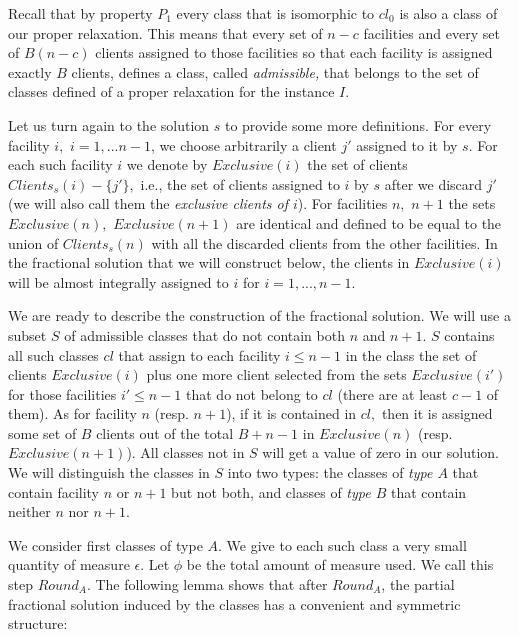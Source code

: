 \documentclass[11pt]{article}\usepackage{amsmath}
\begin{document}
Recall that by property $P_1$ every class that is isomorphic to $cl_0$ is
also a class of our proper relaxation. This means that
every set  of $n-c$ facilities and every  set of $B(n-c)$ clients
assigned to those facilities so that each facility is assigned exactly
$B$ clients, defines a class, called {\em admissible,} that belongs to the set of classes
defined of a  proper relaxation for the instance $I$.

Let  us  turn  again  to  the solution  $s$  to  provide  some  more
definitions.  For   every  facility  $i,$   $i=1,...n-1$,  we  choose
arbitrarily a client $j'$ assigned to  it by $s$. For each such facility
$i$  we   denote  by  $Exclusive(i)$   the  set  of   clients  $
Clients_s(i) - \{j' \},$ i.e., the set of clients assigned to
$i$ by $s$ after we discard $j'$ (we will also call them the
{\em exclusive clients of $i$}). For facilities $n,$ $n+1$ the sets
$Exclusive(n),$ $Exclusive(n+1)$ are identical  and defined to be equal to 
 the union of $Clients_s(n)$ with all
the  discarded clients from  the other  facilities. In  the fractional
solution that we will construct below, the clients in $Exclusive(i)$
will be almost integrally assigned to $i$ for $i=1,...,n-1$.

We  are   ready  to  describe  the  construction   of  the  fractional
solution. We will use a subset $S$ of admissible classes that 
do not contain both $n$ and  $n+1$. $S$ contains all such classes   
 $cl$ that assign to each facility $i \leq
n-1$  in the class  the set  of clients  $Exclusive(i)$ plus  one more
client selected  from the sets $Exclusive(i')$  for those facilities
$i' \leq n-1$ that do not belong  to $cl$ (there are at least $c-1$
of them). As for facility $n$ (resp. $n+1$), if it  is contained in $cl,$ then
it is  assigned some set  of $B$ clients  out of the total  $B+n-1$ in
$Exclusive(n)$ (resp. $Exclusive(n+1)$).  
All classes not in $S$  will get a value
of zero in our solution.
We
will distinguish the classes in $S$ into two types: the classes
of {\em type $A$} that contain facility  $n$ or $n+1$ but not both, and classes
of {\em type $B$} that
 contain neither $n$ nor $n+1$.

We consider  first classes of type  $A$. We give  to each such class   a
very small  quantity of  measure $\epsilon$. Let  $\phi$ be  the total
amount of measure used. We call this step $Round_A$.  The
following  lemma shows  that after  $Round_A$, the  partial fractional
solution  induced  by  the  classes  has a  convenient  and  symmetric
structure:
\end{document}
